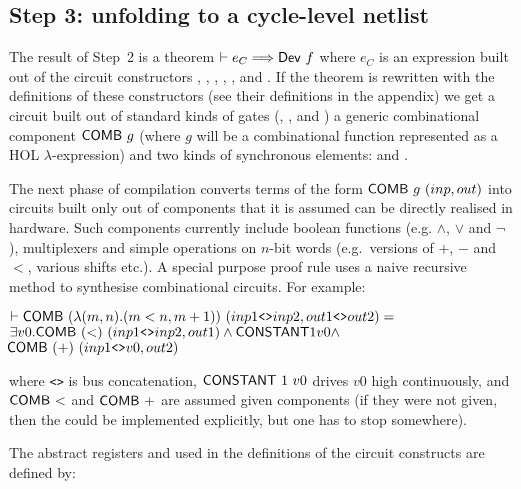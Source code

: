 \vspace*{-3mm}

\subsection*{Step 3: unfolding to a cycle-level netlist}

The result of Step~2 is a theorem
$\vdash e_C \Longrightarrow \mathsf{Dev}~f$ where $e_C$ is an expression built out of the circuit
constructors , 
, , , ,  and . If the theorem
is rewritten with the definitions of these constructors (see their
definitions in the appendix) we get a circuit built out of standard
kinds of gates (, ,  and ) a
generic combinational component $\mathsf{COMB}~g$ (where $g$ will be a
combinational function represented as a HOL $\lambda$-expression) and two
kinds of synchronous elements:
 and . 

The next phase of compilation converts terms of the form $\mathsf{COMB}~g~(inp,out)$
into circuits built only out of components that it is assumed can be directly realised in
hardware. Such components  currently include boolean functions (e.g. $\wedge$,
$\vee$ and $\neg$), multiplexers and simple operations  on $n$-bit words (e.g.~versions
of $+$, $-$ and $<$, various shifts etc.). 
A special purpose proof rule uses a naive recursive method to synthesise
combinational circuits. For example:

\vspace*{-2mm}

{\begin{alltt}
\( \vdash \DEF{COMB}\ ({\lambda}(m,n). (m<n, m+1))\ (inp1\texttt{<>}inp2,out1\texttt{<>}out2) =              \)
\(     {\exists}v0. \DEF{COMB}\ ({<})\ (inp1\texttt{<>}inp2,out1) \wedge \DEF{CONSTANT} 1 v0 \wedge \)
\(         \! \DEF{COMB}\ ({+})\ (inp1\texttt{<>}v0,out2)                                              \)
\end{alltt}}
\vspace*{-2mm}

\noindent where \texttt{<>} is bus concatenation,
$\mathsf{CONSTANT}~1~v0$ drives $v0$ high continuously, and
$\mathsf{COMB}~{<}$ and $\mathsf{COMB}~{+}$ are assumed
given components (if they were not given, then the could be
implemented explicitly, but one has to stop somewhere). 
 
The abstract registers  and  used in the definitions of
the circuit constructs are defined by:

